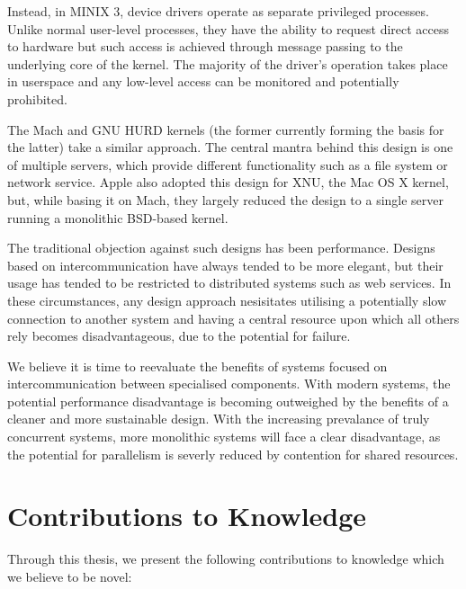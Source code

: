 Instead, in MINIX 3, device drivers operate as separate privileged
processes.  Unlike normal user-level processes, they have the ability
to request direct access to hardware but such access is achieved
through message passing to the underlying core of the kernel.  The
majority of the driver's operation takes place in userspace and any
low-level access can be monitored and potentially prohibited.

The Mach and GNU HURD kernels (the former currently forming the basis
for the latter) take a similar approach.  The central mantra behind
this design is one of multiple servers, which provide different
functionality such as a file system or network service.  Apple also
adopted this design for XNU, the Mac OS X kernel, but, while basing it
on Mach, they largely reduced the design to a single server running a
monolithic BSD-based kernel.

The traditional objection against such designs has been performance.
Designs based on intercommunication have always tended to be more
elegant, but their usage has tended to be restricted to distributed
systems such as web services.  In these circumstances, any design
approach nesisitates utilising a potentially slow connection to
another system and having a central resource upon which all others
rely becomes disadvantageous, due to the potential for failure.

We believe it is time to reevaluate the benefits of systems focused on
intercommunication between specialised components.  With modern
systems, the potential performance disadvantage is becoming outweighed
by the benefits of a cleaner and more sustainable design.  With the
increasing prevalance of truly concurrent systems, more monolithic
systems will face a clear disadvantage, as the potential for
parallelism is severly reduced by contention for shared resources.

\section{Contributions to Knowledge}

Through this thesis, we present the following contributions to
knowledge which we believe to be novel:

